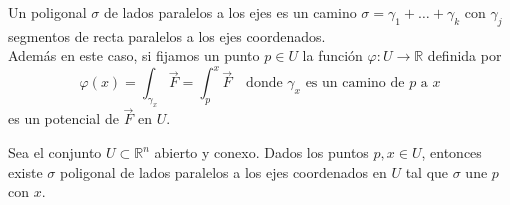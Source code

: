 \begin{observación}
    Un poligonal $\sigma$ de lados paralelos a los ejes es un camino $\sigma = \gamma_1 + \ldots + \gamma_k$ con $\gamma_j$ segmentos de recta paralelos a los ejes coordenados.\\
    Además en este caso, si fijamos un punto $p \in U$ la función $\varphi: U \to \mathbb{R}$ definida por 
    \[
        \varphi(x) = \int_{\gamma_x} \vec{F} = \int_{p}^{x} \vec{F} \quad \text{donde } \gamma_x \text{ es un camino de } p \text{ a } x
    \]
    es un potencial de $\vec{F}$ en $U$.
\end{observación}


\begin{lema}
Sea el conjunto $U \subset \mathbb{R}^n$ abierto y conexo. Dados los puntos $p, x \in U$, entonces existe $\sigma$ poligonal de lados paralelos a los ejes coordenados en $U$ tal que $\sigma$ une $p$ con $x$.
\end{lema}

